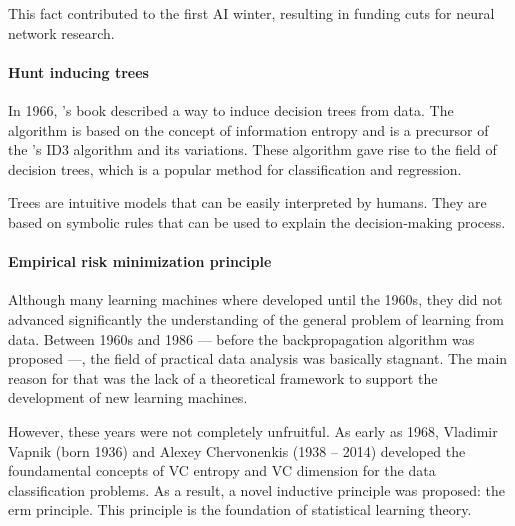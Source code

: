 This fact contributed to the first AI winter, resulting in funding cuts for neural
network research.

\paragraph{Hunt inducing trees}

In 1966, \citeauthor{Hunt1966}'s book described a way to induce decision trees from
data.  The algorithm is based on the concept of information entropy and is a precursor of
the \citeauthor{Quinlan1986}'s ID3 algorithm and its variations.
These algorithm gave rise to the field of decision trees, which is a popular method for
classification and regression.

Trees are intuitive models that can be easily interpreted by humans.  They are based on
symbolic rules that can be used to explain the decision-making process.


\paragraph{Empirical risk minimization principle}

Although many learning machines where developed until the 1960s, they did not advanced
significantly the understanding of the general problem of learning from data.  Between
1960s and 1986 --- before the backpropagation algorithm was proposed ---, the field of practical
data analysis was basically stagnant.  The main reason for that was the lack of a
theoretical framework to support the development of new learning machines.

However, these years were not completely unfruitful.  As early as 1968, Vladimir Vapnik
(born 1936)
and Alexey Chervonenkis (1938 -- 2014) developed the foundamental concepts of VC entropy
and VC dimension for the data classification problems.  As a result, a novel inductive
principle was proposed: the \gls{erm} principle.
This principle is the foundation of statistical learning theory.

%

